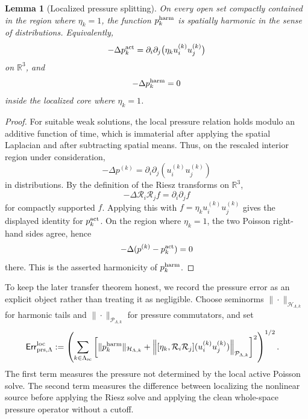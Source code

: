 \documentclass[11pt]{article}
\numberwithin{equation}{section}
\newtheorem{lemma}[theorem]{Lemma}
\newcommand{\R}{\mathbb R}
\newcommand{\Err}{\mathsf{Err}}
\begin{document}
\begin{lemma}[Localized pressure splitting]\label{lem:localized-pressure-splitting}
On every open set compactly contained in the region where \(\eta_k=1\),
the function \(p_k^{\rm harm}\) is spatially harmonic in the sense of
distributions.  Equivalently,
\[
        -\Delta p_k^{\rm act}
        =
        \partial_i\partial_j
        \bigl(\eta_k u_i^{(k)}u_j^{(k)}\bigr)
\]
on \(\R^3\), and
\[
        -\Delta p_k^{\rm harm}=0
\]
inside the localized core where \(\eta_k=1\).
\end{lemma}

\begin{proof}
For suitable weak solutions, the local pressure relation holds modulo an
additive function of time, which is immaterial after applying the spatial
Laplacian and after subtracting spatial means.  Thus, on the rescaled
interior region under consideration,
\[
        -\Delta p^{(k)}
        =
        \partial_i\partial_j
        (u_i^{(k)}u_j^{(k)})
\]
in distributions.  By the definition of the Riesz transforms on
\(\R^3\),
\[
        -\Delta
        \mathcal R_i\mathcal R_j f
        =
        \partial_i\partial_j f
\]
for compactly supported \(f\).  Applying this with
\(f=\eta_k u_i^{(k)}u_j^{(k)}\) gives the displayed identity for
\(p_k^{\rm act}\).  On the region where \(\eta_k=1\), the two Poisson
right-hand sides agree, hence
\[
        -\Delta(p^{(k)}-p_k^{\rm act})=0
\]
there.  This is the asserted harmonicity of \(p_k^{\rm harm}\).
\end{proof}

To keep the later transfer theorem honest, we record the pressure error as
an explicit object rather than treating it as negligible.  Choose
seminorms \(\|\cdot\|_{\mathcal H_{\Lambda,k}}\) for harmonic tails and
\(\|\cdot\|_{\mathcal P_{\Lambda,k}}\) for pressure commutators, and set
\begin{equation}\label{eq:localized-pressure-error}
\begin{aligned}
        \Err_{\rm prs,\Lambda}^{\rm loc}
        &:=
        \left(
        \sum_{k\in\Lambda_{\rm sc}}
        \left[
        \|p_k^{\rm harm}\|_{\mathcal H_{\Lambda,k}}
        +
        \left\|
        [\eta_k,\mathcal R_i\mathcal R_j]
        (u_i^{(k)}u_j^{(k)})
        \right\|_{\mathcal P_{\Lambda,k}}
        \right]^2
        \right)^{1/2}.
\end{aligned}
\end{equation}
The first term measures the pressure not determined by the local active
Poisson solve.  The second term measures the difference between localizing
the nonlinear source before applying the Riesz solve and applying the
clean whole-space pressure operator without a cutoff.
\end{document}
